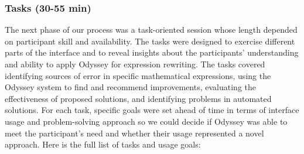 \subsubsection{Tasks (30-55 min)}
The next phase of our process was a task-oriented session 
  whose length depended on participant skill and availability. 
The tasks were designed to exercise different 
  parts of the interface and to reveal insights 
  about the participants' understanding 
  and ability to apply Odyssey for expression rewriting.
The tasks covered 
  identifying sources of error 
  in specific mathematical expressions, 
  using the Odyssey system 
  to find and recommend improvements, 
  evaluating the effectiveness of proposed solutions, 
  and identifying problems in automated solutions. 
For each task, 
  specific goals were set ahead of time in terms of interface usage 
  and problem-solving approach so we could decide 
  if Odyssey was able to meet the participant's need 
  and whether their usage represented a novel approach.
Here is the full list of tasks and usage goals:
